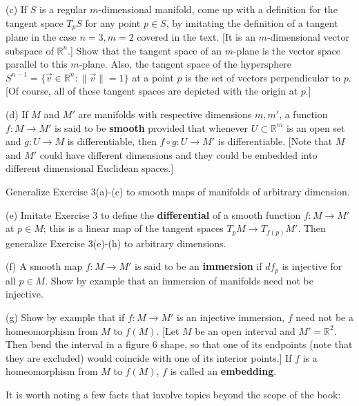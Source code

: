 \documentclass[leqno]{book}
\begin{document}
\begin{enumerate}
(c) If $S$ is a regular $m$-dimensional manifold, come up with a definition for the tangent space $T_pS$ for any point $p\in S$, by imitating the definition of a tangent plane in the case $n=3,m=2$ covered in the text.  [It is an $m$-dimensional vector subspace of $\mathbb R^n$.]  Show that the tangent space of an $m$-plane is the vector space parallel to this $m$-plane.  Also, the tangent space of the hypersphere $S^{n-1}=\{\vec v\in\mathbb R^n:\|\vec v\|=1\}$ at a point $p$ is the set of vectors perpendicular to $p$.  [Of course, all of these tangent spaces are depicted with the origin at $p$.] %

(d) If $M$ and $M'$ are manifolds with respective dimensions $m,m'$, a function $f:M\to M'$ is said to be \textbf{smooth} provided that whenever $U\subset\mathbb R^m$ is an open set and $g:U\to M$ is differentiable, then $f\circ g:U\to M'$ is differentiable.  [Note that $M$ and $M'$ could have different dimensions and they could be embedded into different dimensional Euclidean spaces.]

Generalize Exercise 3(a)-(c) to smooth maps of manifolds of arbitrary dimension.

(e) Imitate Exercise 3 to define the \textbf{differential} of a smooth function $f:M\to M'$ at $p\in M$; this is a linear map of the tangent spaces $T_pM\to T_{f(p)}M'$.  Then generalize Exercise 3(e)-(h) to arbitrary dimensions.

(f) A smooth map $f:M\to M'$ is said to be an \textbf{immersion} if $df_p$ is injective for all $p\in M$.  Show by example that an immersion of manifolds need not be injective.

(g) Show by example that if $f:M\to M'$ is an injective immersion, $f$ need not be a homeomorphism from $M$ to $f(M)$.  [Let $M$ be an open interval and $M'=\mathbb R^2$.  Then bend the interval in a figure 6 shape, so that one of its endpoints (note that they are excluded) would coincide with one of its interior points.]  If $f$ is a homeomorphism from $M$ to $f(M)$, $f$ is called an \textbf{embedding}.

It is worth noting a few facts that involve topics beyond the scope of the book: %


\end{enumerate}
\end{document}
